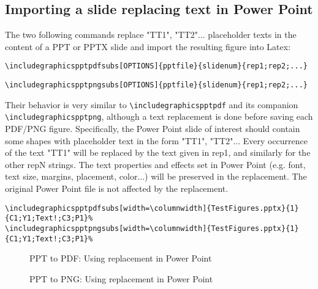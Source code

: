 \documentclass[10pt,,a4paper]{article}
\begin{document}
\subsection{Importing a slide replacing text in Power Point}
The two following commands replace "TT1", "TT2"... placeholder texts in the content of a PPT or PPTX slide and import the resulting figure into Latex:
\begin{small}
\begin{verbatim}
\includegraphicspptpdfsubs[OPTIONS]{pptfile}{slidenum}{rep1;rep2;...}
\end{verbatim}
\end{small}
\begin{small}
\begin{verbatim}
\includegraphicspptpngsubs[OPTIONS]{pptfile}{slidenum}{rep1;rep2;...}
\end{verbatim}
\end{small}

Their behavior is very similar to \verb!\includegraphicspptpdf! and its companion \verb!\includegraphicspptpng!, although a text replacement is done before saving each PDF/PNG figure.
Specifically, the Power Point slide of interest should contain some shapes with placeholder text in the form "TT1", "TT2"...
Every occurrence of the text "TT1" will be replaced by the text given in rep1, and similarly for the other repN strings.
The text properties and effects set in Power Point (e.g. font, text size, margins, placement, color...) will be preserved in the replacement.
The original Power Point file is not affected by the replacement.

\begin{scriptsize}\begin{verbatim}
\includegraphicspptpdfsubs[width=\columnwidth]{TestFigures.pptx}{1}{C1;Y1;Text!;C3;P1}%
\includegraphicspptpngsubs[width=\columnwidth]{TestFigures.pptx}{1}{C1;Y1;Text!;C3;P1}%
\end{verbatim}\end{scriptsize}
\begin{figure}%
%
\caption{PPT to PDF: Using replacement in Power Point}%
\label{}%
\end{figure}

\begin{figure}%
%
\caption{PPT to PNG: Using replacement in Power Point}%
\label{}%
\end{figure}
\end{document}
